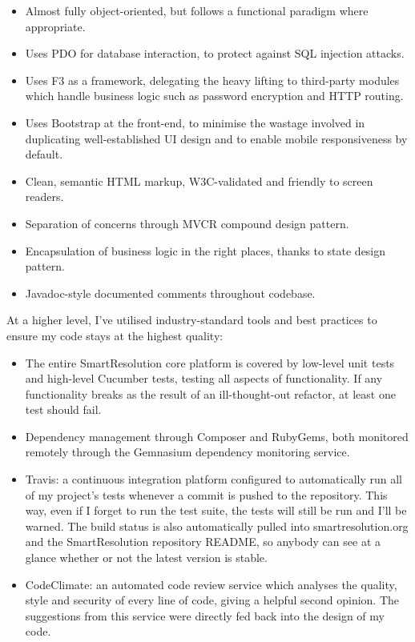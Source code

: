 \begin{itemize}
\item Almost fully object-oriented, but follows a functional paradigm where appropriate.
\item Uses PDO for database interaction, to protect against SQL injection attacks.
\item Uses F3 as a framework, delegating the heavy lifting to third-party modules which handle business logic such as password encryption and HTTP routing.
\item Uses Bootstrap at the front-end, to minimise the wastage involved in duplicating well-established UI design and to enable mobile responsiveness by default.
\item Clean, semantic HTML markup, W3C-validated and friendly to screen readers.
\item Separation of concerns through MVCR compound design pattern.
\item Encapsulation of business logic in the right places, thanks to state design pattern.
\item Javadoc-style documented comments throughout codebase.
\end{itemize}

At a higher level, I've utilised industry-standard tools and best practices to ensure my code stays at the highest quality:

\begin{itemize}
\item The entire SmartResolution core platform is covered by low-level unit tests and high-level Cucumber tests, testing all aspects of functionality. If any functionality breaks as the result of an ill-thought-out refactor, at least one test should fail.
\item Dependency management through Composer and RubyGems, both monitored remotely through the Gemnasium dependency monitoring service.
\item Travis: a continuous integration platform configured to automatically run all of my project's tests whenever a commit is pushed to the repository. This way, even if I forget to run the test suite, the tests will still be run and I'll be warned. The build status is also automatically pulled into smartresolution.org and the SmartResolution repository README, so anybody can see at a glance whether or not the latest version is stable.
\item CodeClimate: an automated code review service which analyses the quality, style and security of every line of code, giving a helpful second opinion. The suggestions from this service were directly fed back into the design of my code.
\end{itemize}

